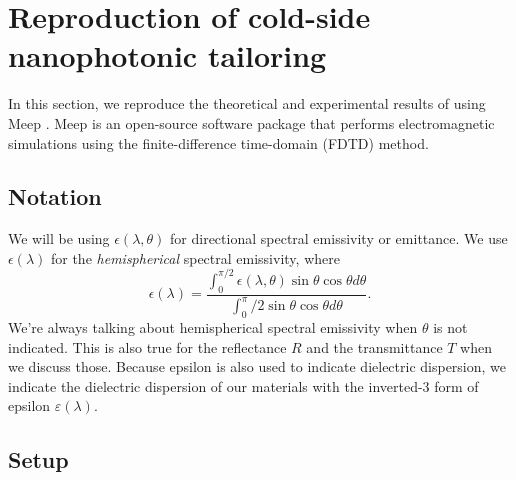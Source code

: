 \documentclass[%
 reprint,
 amsmath,amssymb,
 aps
]{revtex4-2}
\begin{document}
\section{Reproduction of cold-side nanophotonic tailoring} \label{reproduction}

In this section, we reproduce the theoretical and experimental results of \cite{ilic} using Meep \cite{meep}. Meep is an open-source software package that performs electromagnetic simulations using the finite-difference time-domain (FDTD) method.

\subsection{Notation}
We will be using $\epsilon(\lambda, \theta)$ for directional spectral emissivity or emittance. We use $\epsilon(\lambda)$ for the {\it hemispherical} spectral emissivity, where \begin{equation}
\epsilon(\lambda) = \frac{\int_0^{\pi/2}\epsilon(\lambda, \theta)\sin\theta\cos\theta d\theta}{\int_0 ^ \pi/2 \sin\theta\cos\theta d\theta}.
\end{equation} We're always talking about hemispherical spectral emissivity when $\theta$ is not indicated. This is also true for the reflectance $R$ and the transmittance $T$ when we discuss those. Because epsilon is also used to indicate dielectric dispersion, we indicate the dielectric dispersion of our materials with the inverted-3 form of epsilon $\varepsilon(\lambda)$.
\subsection{Setup}
\end{document}
